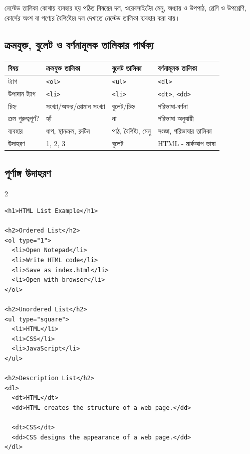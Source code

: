 \begin{keypointbox}{নেস্টেড তালিকা কোথায় ব্যবহার হয়}
পঠিত বিষয়ের দল, ওয়েবসাইটের মেনু, অধ্যায় ও উপপাঠ, শ্রেণি ও উপশ্রেণি, কোর্সের অংশ বা পণ্যের বৈশিষ্ট্যের দল দেখাতে নেস্টেড তালিকা ব্যবহার করা যায়।
\end{keypointbox}

\subsection{ক্রমযুক্ত, বুলেট ও বর্ণনামূলক তালিকার পার্থক্য}

\begin{center}
\small
\begin{tabular}{|p{}|p{}|p{}|p{}|}
\hline
\textbf{বিষয়} & \textbf{ক্রমযুক্ত তালিকা} & \textbf{বুলেট তালিকা} & \textbf{বর্ণনামূলক তালিকা} \\
\hline
ট্যাগ & \texttt{<ol>} & \texttt{<ul>} & \texttt{<dl>} \\
\hline
উপাদান ট্যাগ & \texttt{<li>} & \texttt{<li>} & \texttt{<dt>}, \texttt{<dd>} \\
\hline
চিহ্ন & সংখ্যা/অক্ষর/রোমান সংখ্যা & বুলেট/চিহ্ন & পরিভাষা-বর্ণনা \\
\hline
ক্রম গুরুত্বপূর্ণ? & হ্যাঁ & না & পরিভাষা অনুযায়ী \\
\hline
ব্যবহার & ধাপ, স্থানক্রম, রুটিন & পাঠ, বৈশিষ্ট্য, মেনু & সংজ্ঞা, পরিভাষার তালিকা \\
\hline
উদাহরণ & 1, 2, 3 & বুলেট & HTML - মার্কআপ ভাষা \\
\hline
\end{tabular}
\normalsize
\end{center}

\subsection{পূর্ণাঙ্গ উদাহরণ}

\par{}\par
\begin{multicols}{2}
\begin{verbatim}
<h1>HTML List Example</h1>

<h2>Ordered List</h2>
<ol type="1">
  <li>Open Notepad</li>
  <li>Write HTML code</li>
  <li>Save as index.html</li>
  <li>Open with browser</li>
</ol>

<h2>Unordered List</h2>
<ul type="square">
  <li>HTML</li>
  <li>CSS</li>
  <li>JavaScript</li>
</ul>

<h2>Description List</h2>
<dl>
  <dt>HTML</dt>
  <dd>HTML creates the structure of a web page.</dd>

  <dt>CSS</dt>
  <dd>CSS designs the appearance of a web page.</dd>
</dl>
\end{verbatim}
\end{multicols}



